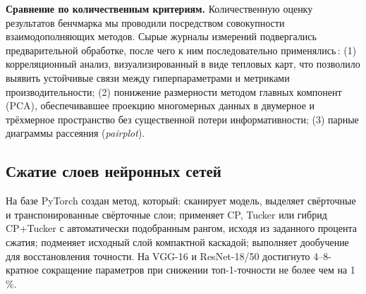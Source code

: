 \textbf{Сравнение по количественным критериям.} Количественную оценку результатов бенчмарка мы проводили посредством совокупности взаимодополняющих методов. Сырые журналы измерений подвергались предварительной обработке, после чего к ним последовательно применялись\,: (1) корреляционный анализ, визуализированный в виде тепловых карт, что позволило выявить устойчивые связи между гиперпараметрами и метриками производительности; (2) понижение размерности методом главных компонент (PCA), обеспечивавшее проекцию многомерных данных в двумерное и трёхмерное пространство без существенной потери информативности; (3) парные диаграммы рассеяния (\textit{pairplot}).

\subsection*{Сжатие слоев нейронных сетей}  
На базе PyTorch создан метод, который: сканирует модель, выделяет свёрточные и транспонированные свёрточные слои; применяет CP, Tucker или гибрид CP+Tucker с автоматически подобранным рангом, исходя из заданного процента сжатия; подменяет исходный слой компактной каскадой; выполняет дообучение для восстановления точности. На VGG-16 и ResNet-18/50 достигнуто 4–8-кратное сокращение параметров при снижении топ-1-точности не более чем на 1 \%.